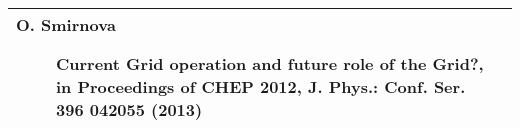 \begin{center}
{\begin{tabular}{@{}p{25mm}|p{190mm}@{}}
{\begin{description}

\item [O. Smirnova] Current Grid operation and future role of the Grid?, in Proceedings of CHEP 2012, J. Phys.: Conf. Ser. 396 042055 (2013)


\end{description}}\tabularnewline\bottomrule

\end{tabular}
}%
\end{center}
